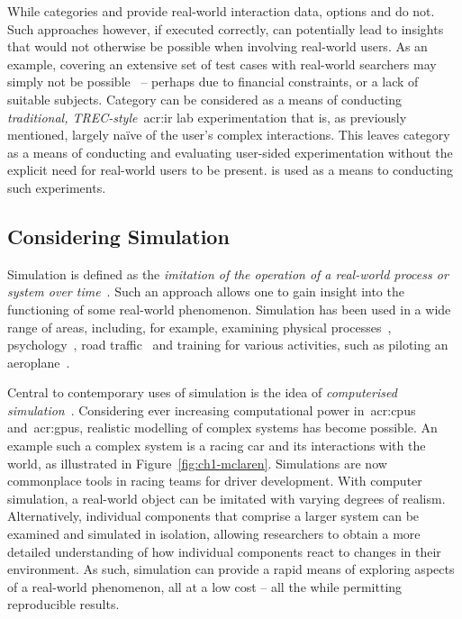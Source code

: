 While categories  and  provide real-world interaction data, options  and  do not. Such approaches however, if executed correctly, can potentially lead to insights that would not otherwise be possible when involving real-world users. As an example, covering an extensive set of test cases with real-world searchers may simply not be possible~\citep{keskustalo2008user_simulation} -- perhaps due to financial constraints, or a lack of suitable subjects. Category  can be considered as a means of conducting \emph{traditional, TREC-style}~\gls{acr:ir} lab experimentation that is, as previously mentioned, largely na\"{i}ve of the user's complex interactions. This leaves category  as a means of conducting and evaluating user-sided experimentation without the explicit need for real-world users to be present.  is used as a means to conducting such experiments.

\subsection{Considering Simulation}\label{sec:intro:simulation}
Simulation is defined as the \emph{imitation of the operation of a real-world process or system over time}~\citep{banks1996discrete}. Such an approach allows one to gain insight into the functioning of some real-world phenomenon. Simulation has been used in a wide range of areas, including, for example, examining physical processes~\citep{haessig1991physics_modelling}, psychology~\citep{hastie1988human_memory_simulation}, road traffic~\citep{mahmud2016traffic_modelling_electric} and training for various activities, such as piloting an aeroplane~\citep{sparko2010flight_simulators}.

Central to contemporary uses of simulation is the idea of \emph{computerised simulation}~\citep{heermann1990computer_simulation}. Considering ever increasing computational power in~\glspl{acr:cpu} and~\glspl{acr:gpu}, realistic modelling of complex systems has become possible. An example such a complex system is a racing car and its interactions with the world, as illustrated in Figure~\ref{fig:ch1-mclaren}. Simulations are now commonplace tools in racing teams for driver development. With computer simulation, a real-world object can be imitated with varying degrees of realism. Alternatively, individual components that comprise a larger system can be examined and simulated in isolation, allowing researchers to obtain a more detailed understanding of how individual components react to changes in their environment. As such, simulation can provide a rapid means of exploring aspects of a real-world phenomenon, all at a low cost -- all the while permitting reproducible results.

